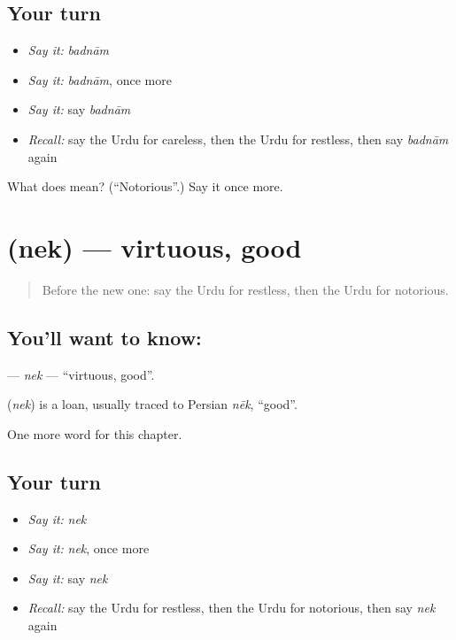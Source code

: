\subsection*{Your turn}
\begin{itemize}
\raggedright
  \item \emph{Say it:} \emph{badnām}
  \item \emph{Say it:} \emph{badnām}, once more
  \item \emph{Say it:} say \emph{badnām}
  \item \emph{Recall:} say the Urdu for careless, then the Urdu for restless, then say \emph{badnām} again
\end{itemize}

\begin{tcolorbox}[breakable,colback=teal!4,colframe=teal!35!black,title={Before you move on}]
What does  mean? (\textquotedblleft{}Notorious\textquotedblright{}.) Say it once more.
\end{tcolorbox}
\section[\texorpdfstring{\ur{نیک} (nek)}{نیک (nek)}]{ (nek) — virtuous, good}

\label{lesson:UR-C196-nek}



\begin{quote}
Before the new one: say the Urdu for restless, then the Urdu for notorious.
\end{quote}

\subsection*{You'll want to know: }
\textbf{} — \emph{nek} — \textquotedblleft{}virtuous, good\textquotedblright{}.

\begin{cousinweb}
\textbf{} (\emph{nek}) is a loan, usually traced to Persian \emph{nēk}, \textquotedblleft{}good\textquotedblright{}.
\end{cousinweb}

\begin{grammarlens}[title={What you've built}]
One more word for this chapter.
\end{grammarlens}

\subsection*{Your turn}
\begin{itemize}
\raggedright
  \item \emph{Say it:} \emph{nek}
  \item \emph{Say it:} \emph{nek}, once more
  \item \emph{Say it:} say \emph{nek}
  \item \emph{Recall:} say the Urdu for restless, then the Urdu for notorious, then say \emph{nek} again
\end{itemize}

